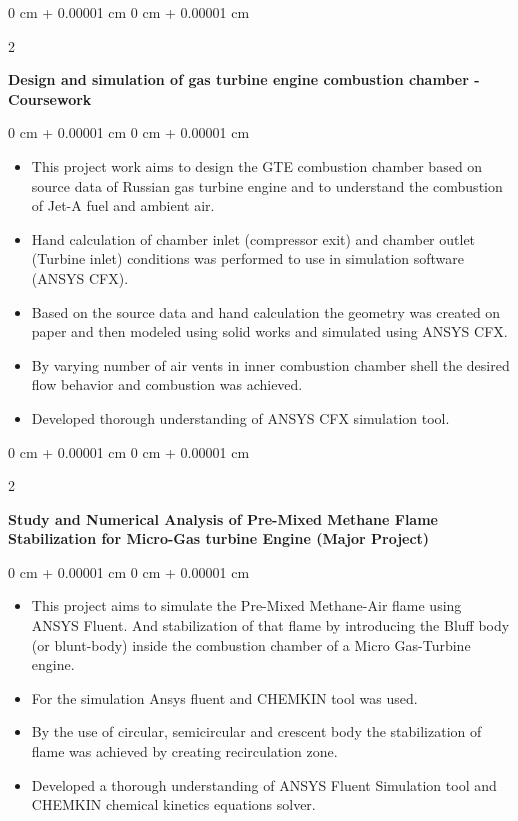 \documentclass[10pt, letterpaper]{article}
\newenvironment{highlights}{
    \begin{itemize}[
        topsep=0.10 cm,
        parsep=0.10 cm,
        partopsep=0pt,
        itemsep=0pt,
        leftmargin=0 cm + 10pt
    ]
}{
    \end{itemize}
} %
\newenvironment{onecolentry}{
    \begin{adjustwidth}{
        0 cm + 0.00001 cm
    }{
        0 cm + 0.00001 cm
    }
}{
    \end{adjustwidth}
} %
\newenvironment{twocolentry}[2][]{
    \onecolentry
    \def\secondColumn{#2}
    \setcolumnwidth{\fill, 4.5 cm}
    \begin{paracol}{2}
}{
    \switchcolumn \raggedleft \secondColumn
    \end{paracol}
    \endonecolentry
} %
\begin{document}
        \vspace{0.2 cm}

        \begin{twocolentry}{
            2021
        }
            \textbf{Design and simulation of gas turbine engine combustion chamber - Coursework}\end{twocolentry}

        \vspace{0.10 cm}
        \begin{onecolentry}
            \begin{highlights}
                \item This project work aims to design the GTE combustion chamber based on source data of Russian gas turbine engine and to understand the combustion of Jet-A fuel and ambient air.
                \item Hand calculation of chamber inlet (compressor exit) and chamber outlet (Turbine inlet) conditions was performed to use in simulation software (ANSYS CFX).
                \item Based on the source data and hand calculation the geometry was created on paper and then modeled using solid works and simulated using ANSYS CFX.
                \item By varying number of air vents in inner combustion chamber shell the desired flow behavior and combustion was achieved.
                \item Developed thorough understanding of ANSYS CFX simulation tool.
            \end{highlights}
        \end{onecolentry}

        \vspace{0.1 cm}

        \begin{twocolentry}{
            2020
        }
            \textbf{Study and Numerical Analysis of Pre-Mixed Methane Flame Stabilization for Micro-Gas turbine Engine (Major Project)}\end{twocolentry}

        \vspace{0.1 cm}
        \begin{onecolentry}
            \begin{highlights}
                \item This project aims to simulate the Pre-Mixed Methane-Air flame using ANSYS Fluent. And stabilization of that flame by introducing the Bluff body (or blunt-body) inside the combustion chamber of a Micro Gas-Turbine engine.
                \item For the simulation Ansys fluent and CHEMKIN tool was used.
                \item By the use of circular, semicircular and crescent body the stabilization of flame was achieved by creating recirculation zone.
                \item Developed a thorough understanding of ANSYS Fluent Simulation tool and CHEMKIN chemical kinetics equations solver.
            \end{highlights}
        \end{onecolentry}
\end{document}
